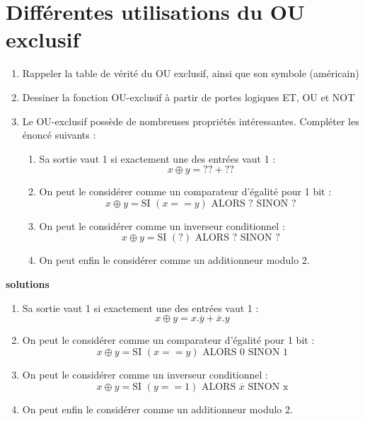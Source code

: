 \documentclass[a4paper,11pt]{article}
\begin{document}

\newpage
\section{Différentes utilisations du OU exclusif}
\begin{enumerate}

\item Rappeler la table de vérité du OU exclusif, ainsi que son symbole (américain)
\item Dessiner la fonction OU-exclusif à partir de portes logiques ET, OU et NOT
\item Le OU-exclusif possède de nombreuses propriétés intéressantes. Compléter les énoncé suivants :

\begin{enumerate}
\item Sa sortie vaut 1 si exactement une des entrées vaut 1 :
$$x \oplus y  = ?? + ??$$
\item On peut le considérer comme un comparateur d'égalité pour 1 bit :
$$x \oplus y = \textrm{SI } (x==y) \textrm{ ALORS ? SINON ?} $$
\item On peut le considérer comme un inverseur conditionnel :
$$x \oplus y = \textrm{SI } (?) \textrm{ ALORS ? SINON ?} $$
\item On peut enfin le considérer comme un additionneur modulo 2.

\end{enumerate}

\end{enumerate}

\begin{cadre}
{\bf solutions}
  \begin{enumerate}
  \item Sa sortie vaut 1 si exactement une des entrées vaut 1 : $$x \oplus y  = x.\overline{y} + \overline{x}.y$$
  \item On peut le considérer comme un comparateur d'égalité pour 1 bit : $$x \oplus y = \textrm{SI } (x==y) \textrm{ ALORS 0 SINON 1} $$
  \item On peut le considérer comme un inverseur conditionnel : $$x \oplus y = \textrm{SI } (y==1) \textrm{ ALORS } \overline{x} \textrm{ SINON x}$$
  \item On peut enfin le considérer comme un additionneur modulo 2.
  \end{enumerate}
\end{cadre}
\end{document}
